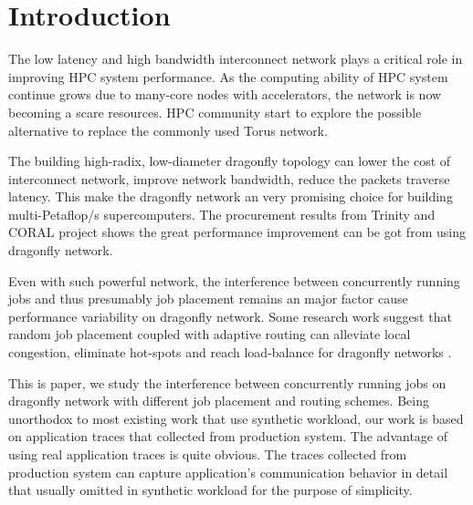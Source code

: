 \documentclass[conference,compsoc]{IEEEtran}
\begin{document}




%
\IEEEpeerreviewmaketitle



\section{Introduction}
\label{sec:intro}

The low latency and high bandwidth interconnect network plays a critical role in improving HPC system performance. As the computing ability of HPC system continue grows due to many-core nodes with accelerators, the network is now becoming a scare resources. HPC community start to explore the possible alternative to replace the commonly used Torus network.

The building high-radix, low-diameter dragonfly topology can lower the cost of interconnect network, improve network bandwidth, reduce the packets traverse latency. This make the dragonfly network an very promising choice for building multi-Petaflop/s supercomputers\cite{dally-dragonfly}. The procurement results from Trinity and CORAL project shows the great performance improvement can be got from using dragonfly network. 


Even with such powerful network, the interference between concurrently running jobs and thus presumably job placement remains an major factor cause performance variability on dragonfly network\cite{bhatele2015, dskinner}. Some research work suggest that random job placement coupled with adaptive routing can alleviate local congestion, eliminate hot-spots and reach load-balance for dragonfly networks \cite{jain-sc14, bhatele-sc11, brandt2014}. 

This is paper, we study the interference between concurrently running jobs on dragonfly network with different job placement and routing schemes. Being unorthodox to most existing work that use synthetic workload, our work is based on application traces that collected from production system. The advantage of using real application traces is quite obvious. The traces collected from production system can capture application's communication behavior in detail that usually omitted in synthetic workload for the purpose of simplicity. 
\end{document}
